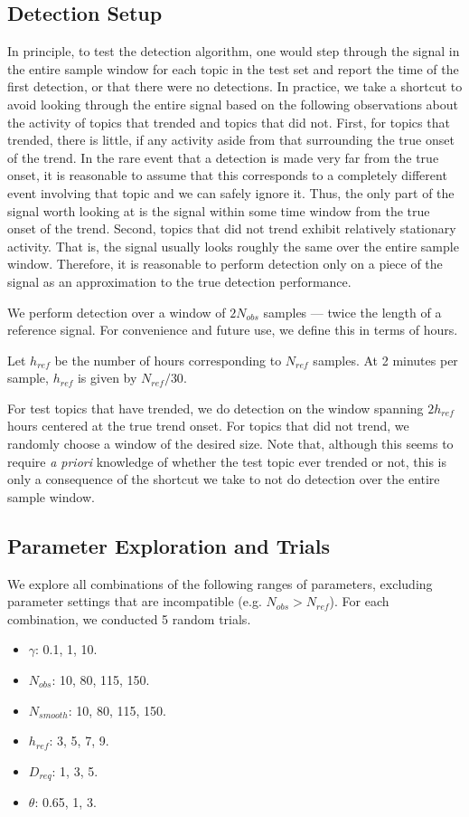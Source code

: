\subsection{Detection Setup}
In principle, to test the detection algorithm, one would step through the signal
in the entire sample window for each topic in the test set and report the time
of the first detection, or that there were no detections. In practice, we take a
shortcut to avoid looking through the entire signal based on the following
observations about the activity of topics that trended and topics that did
not. First, for topics that trended, there is little, if any activity aside from
that surrounding the true onset of the trend. In the rare event that a detection
is made very far from the true onset, it is reasonable to assume that this
corresponds to a completely different event involving that topic and we can
safely ignore it. Thus, the only part of the signal worth looking at is the
signal within some time window from the true onset of the trend. Second, topics
that did not trend exhibit relatively stationary activity. That is, the signal
usually looks roughly the same over the entire sample window. Therefore, it is
reasonable to perform detection only on a piece of the signal as an
approximation to the true detection performance.

We perform detection over a window of $2N_{obs}$ samples --- twice the length of a
reference signal. For convenience and future use, we define this in terms of hours.

\begin{defn}
Let $h_{ref}$ be the number of hours corresponding to $N_{ref}$ samples. At 2 minutes per sample, $h_{ref}$ is given by $N_{ref} / 30$.
\end{defn}

For test topics that have trended, we do detection on the window spanning
$2h_{ref}$ hours centered at the true trend onset. For topics that did not
trend, we randomly choose a window of the desired size. Note that, although this
seems to require {\em a priori} knowledge of whether the test topic ever trended
or not, this is only a consequence of the shortcut we take to not do detection
over the entire sample window.

\subsection{Parameter Exploration and Trials}
We explore all combinations of the following ranges of parameters, excluding
parameter settings that are incompatible (e.g. $N_{obs} > N_{ref}$). For each
combination, we conducted 5 random trials.

\begin{itemize}
\item $\gamma$: 0.1, 1, 10.
\item $N_{obs}$: 10, 80, 115, 150.
\item $N_{smooth}$: 10, 80, 115, 150.
\item $h_{ref}$: 3, 5, 7, 9.
\item $D_{req}$: 1, 3, 5.
\item $\theta$: 0.65, 1, 3.
\end{itemize}

